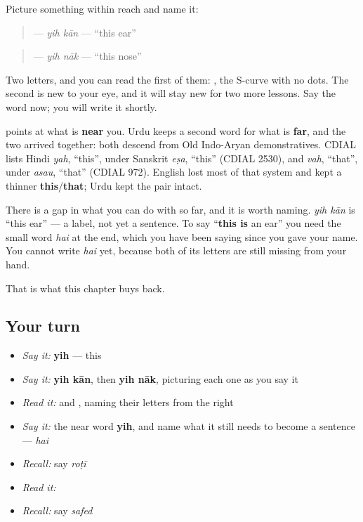 Picture something within reach and name it:

\begin{quote}
\textbf{ } — \emph{yih kān} — \textquotedblleft{}this ear\textquotedblright{}
\end{quote}

\begin{quote}
\textbf{ } — \emph{yih nāk} — \textquotedblleft{}this nose\textquotedblright{}
\end{quote}

Two letters, and you can read the first of them: \textbf{}, the S-curve with no dots. The second is new to your eye, and it will stay new for two more lessons. Say the word now; you will write it shortly.

\begin{cousinweb}
\textbf{} points at what is \textbf{near} you. Urdu keeps a second word for what is \textbf{far}, and the two arrived together: both descend from Old Indo-Aryan demonstratives. CDIAL lists Hindi \emph{yah}, \textquotedblleft{}this\textquotedblright{}, under Sanskrit \emph{eṣa}, \textquotedblleft{}this\textquotedblright{} (CDIAL 2530), and \emph{vah}, \textquotedblleft{}that\textquotedblright{}, under \emph{asau}, \textquotedblleft{}that\textquotedblright{} (CDIAL 972). English lost most of that system and kept a thinner \textbf{this}/\textbf{that}; Urdu kept the pair intact.

There is a gap in what you can do with \textbf{} so far, and it is worth naming. \emph{yih kān} is \textquotedblleft{}this ear\textquotedblright{} — a label, not yet a sentence. To say \textquotedblleft{}\textbf{this is} an ear\textquotedblright{} you need the small word \emph{hai} at the end, which you have been saying since you gave your name. You cannot write \emph{hai} yet, because both of its letters are still missing from your hand.

That is what this chapter buys back.
\end{cousinweb}

\subsection*{Your turn}
\begin{itemize}
\raggedright
  \item \emph{Say it:} \textbf{yih} — this
  \item \emph{Say it:} \textbf{yih kān}, then \textbf{yih nāk}, picturing each one as you say it
  \item \emph{Read it:}  and , naming their letters from the right
  \item \emph{Say it:} the near word \textbf{yih}, and name what it still needs to become a sentence — \emph{hai}
  \item \emph{Recall:} say \emph{roṭī}
  \item \emph{Read it:} \textbf{}
  \item \emph{Recall:} say \emph{safed}
\end{itemize}

